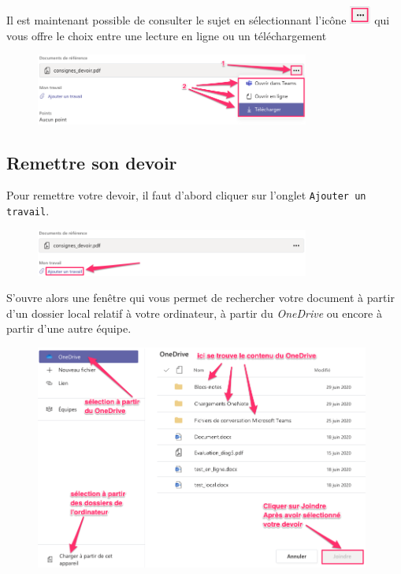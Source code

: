 Il est maintenant possible de consulter le sujet en sélectionnant l'icône \includegraphics[width=0.7cm]{./images/teams/pointilles} qui vous offre le choix entre une lecture en ligne ou un téléchargement

\begin{figure}[H]
\includegraphics[width=9cm]{./images/teams/choix_pointilles}
\centering
\end{figure}

\subsection{Remettre son devoir}\label{TeamsRemettreDevoir}

Pour remettre votre devoir, il faut d'abord cliquer sur l'onglet \texttt{Ajouter un travail}. 

\begin{figure}[H]
\includegraphics[width=9cm]{./images/teams/ajout}
\centering
\end{figure}

S'ouvre alors une fenêtre qui vous permet de rechercher votre document à partir d'un dossier local relatif à votre ordinateur, à partir du \emph{OneDrive} ou encore à partir d'une autre équipe.

\begin{figure}[H]
\includegraphics[width=11cm]{./images/teams/selection_devoir}
\centering
\end{figure}

